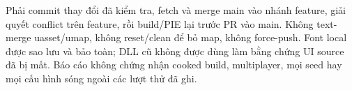 Phải commit thay đổi đã kiểm tra, fetch và merge main vào nhánh feature, giải quyết conflict trên feature, rồi build/PIE lại trước PR vào main. Không text-merge uasset/umap, không reset/clean để bỏ map, không force-push. Font local được sao lưu và bảo toàn; DLL cũ không được dùng làm bằng chứng UI source đã bị mất. Báo cáo không chứng nhận cooked build, multiplayer, mọi seed hay mọi cấu hình sóng ngoài các lượt thử đã ghi.
